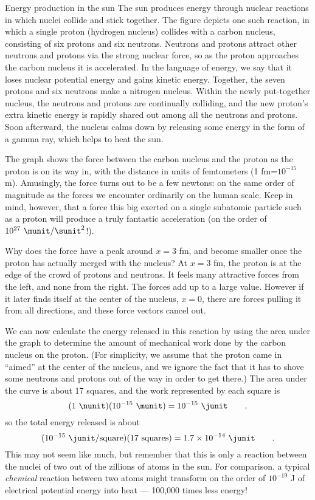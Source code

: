 \begin{eg}{Energy production in the sun}\label{eg:cno-cycle}
The sun produces energy through nuclear reactions in which
nuclei collide and stick together. The figure depicts one
such reaction, in which a single proton (hydrogen nucleus)
collides with a carbon nucleus, consisting of six protons
and six neutrons. Neutrons and protons attract other
neutrons and protons via the strong nuclear force, so as the
proton approaches the carbon nucleus it is accelerated. In
the language of energy, we say that it loses nuclear
potential energy and gains kinetic energy. Together, the
seven protons and six neutrons make a nitrogen nucleus.
Within the newly put-together nucleus, the neutrons and
protons are continually colliding, and the new proton's
extra kinetic energy is rapidly shared out among all the
neutrons and protons. Soon afterward, the nucleus calms down
by releasing some energy in the form of a gamma ray, which
helps to heat the sun.

The graph shows the force between the carbon nucleus and the
proton as the proton is on its way in, with the distance in
units of femtometers (1 fm=$10^{-15}$ m). Amusingly, the
force turns out to be a few newtons: on the same order of
magnitude as the forces we encounter ordinarily on the human
scale. Keep in mind, however, that a force this big exerted
on a single subatomic particle such as a proton will produce
a truly fantastic acceleration (on the order of $10^{27}\ \munit/\sunit^2$!).

Why does the force have a peak around $x=3$ fm, and become
smaller once the proton has actually merged with the
nucleus? At $x=3$ fm, the proton is at the edge of the crowd
of protons and neutrons. It feels many attractive forces
from the left, and none from the right. The forces add up to
a large value. However if it later finds itself at the
center of the nucleus, $x=0$, there are forces pulling it
from all directions, and these force vectors cancel out.

We can now calculate the energy released in this reaction by
using the area under the graph to determine the amount of
mechanical work done by the carbon nucleus on the proton.
(For simplicity, we assume that the proton came in ``aimed''
at the center of the nucleus, and we ignore the fact that it
has to shove some neutrons and protons out of the way in
order to get there.) The area under the curve is about 17
squares, and the work represented by each square is
\begin{equation*}
                (1\ \nunit)(10^{-15}\ \munit)  =  10^{-15}\ \junit   \qquad   ,
\end{equation*}
so the total energy released is about
\begin{equation*}
                (10^{-15}\ \junit/\text{square})(17\ \text{squares}) =  1.7\times10^{-14}\ \junit   \qquad   .
\end{equation*}
This may not seem like much, but remember that this is only
a reaction between the nuclei of two out of the zillions of
atoms in the sun. For comparison, a typical \emph{chemical}
reaction between two atoms might transform on the order of
$10^{-19}$ J of electrical potential energy into heat ---
100,000 times less energy!


\end{eg}

